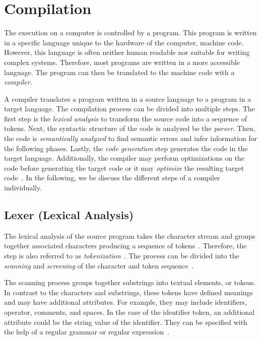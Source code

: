 \section{Compilation}
\label{sec:background_compilation}
The execution on a computer is controlled by a program. This program is written in a specific language unique to the hardware of the computer, machine code. However, this language is often neither human readable nor suitable for writing complex systems. Therefore, most programs are written in a more accessible language. The program can then be translated to the machine code with a \emph{compiler}. 

A compiler translates a program written in a source language to a program in a target language. The compilation process can be divided into multiple steps. The first step is the \emph{lexical analysis} to transform the source code into a sequence of tokens. Next, the syntactic structure of the code is analyzed be the \emph{parser}. Then, the code is \emph{semantically analyzed} to find semantic errors and infer information for the following phases. Lastly, the \emph{code generation} step generates the code in the target language. Additionally, the compiler may perform optimizations on the code before generating the target code or it may \emph{optimize} the resulting target code~\cite{Oliv07,VSSD07}. In the following, we be discuss the different steps of a compiler individually.

\subsection{Lexer (Lexical Analysis)}
\label{sec:background_lexer}
The lexical analysis of the source program takes the character stream and groups together associated characters producing a sequence of tokens~\cite{Oliv07}. Therefore, the step is also referred to as \emph{tokenization}~\cite{Gref99}. The process can be divided into the \emph{scanning} and \emph{screening} of the character and token sequence~\cite{DeRe74}.

The scanning process groups together substrings into textual elements, or tokens. In contrast to the characters and substrings, these tokens have defined meanings and may have additional attributes. For example, they may include identifiers, operator, comments, and spaces. In the case of the identifier token, an additional attribute could be the string value of the identifier. They can be specified with the help of a regular grammar or regular expression~\cite{DeRe74,VSSD07}.  

